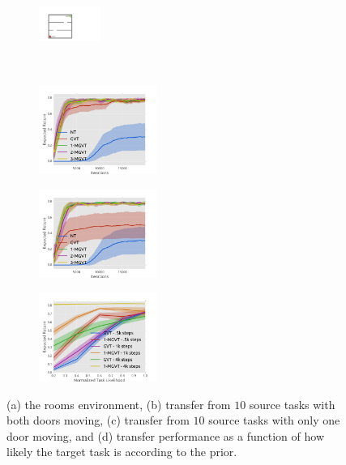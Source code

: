 \documentclass{article}
\begin{document}
\begin{figure}[t] 
  \begin{subfigure}[b]{0.15\textwidth}
    \includegraphics[trim=0.0cm 0.2cm 0.0cm 0.2cm,clip=true,height=3cm, width=2.0cm]{images/rooms2.pdf}
    \caption{}
  \end{subfigure}
  \begin{subfigure}[b]{0.27\textwidth}
    \includegraphics[trim=0.5cm 0cm 1.8cm 1.3cm,clip=true,height=2.9cm]{images/three-room/lrev.pdf}
    \caption{}
  \end{subfigure}
    \begin{subfigure}[b]{0.27\textwidth}
    \includegraphics[trim=0.5cm 0cm 1.6cm 1.3cm,clip=true,height=2.9cm]{images/three-room-gen/lrev.pdf}
    \caption{}
  \end{subfigure}
    \begin{subfigure}[b]{0.27\textwidth}
    \includegraphics[trim=0.5cm 0cm 1.6cm 1.3cm,clip=true,height=2.9cm]{images/likelihood/lrew.pdf}
    \caption{}
  \end{subfigure}
  \caption{(a) the rooms environment, (b) transfer from $10$ source tasks with both doors moving, (c) transfer from $10$ source tasks with only one door moving, and (d) transfer performance as a function of how likely the target task is according to the prior.}
  \label{fig:dipfdbsgraphplots}
\end{figure}
\end{document}
